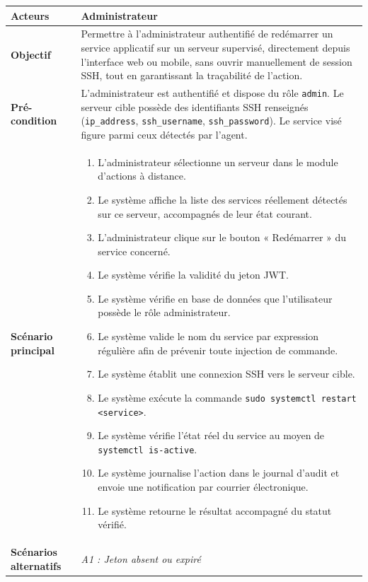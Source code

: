 \renewcommand{\arraystretch}{1.4}
\begin{longtable}{|p{3.0cm}|>{\raggedright\arraybackslash}p{11.4cm}|}
\hline
\textbf{Acteurs} & Administrateur \\
\hline
\textbf{Objectif} & Permettre à l'administrateur authentifié de redémarrer un service
applicatif sur un serveur supervisé, directement depuis l'interface web ou mobile, sans
ouvrir manuellement de session SSH, tout en garantissant la traçabilité de l'action. \\
\hline
\textbf{Pré-condition} & L'administrateur est authentifié et dispose du rôle
\texttt{admin}. Le serveur cible possède des identifiants SSH renseignés
(\texttt{ip\_address}, \texttt{ssh\_username}, \texttt{ssh\_password}). Le service visé
figure parmi ceux détectés par l'agent. \\
\hline
\textbf{Scénario principal} &
\begin{enumerate}[leftmargin=*, nosep]
  \item L'administrateur sélectionne un serveur dans le module d'actions à distance.
  \item Le système affiche la liste des services réellement détectés sur ce serveur,
        accompagnés de leur état courant.
  \item L'administrateur clique sur le bouton « Redémarrer » du service concerné.
  \item Le système vérifie la validité du jeton JWT.
  \item Le système vérifie en base de données que l'utilisateur possède le rôle
        administrateur.
  \item Le système valide le nom du service par expression régulière afin de prévenir
        toute injection de commande.
  \item Le système établit une connexion SSH vers le serveur cible.
  \item Le système exécute la commande \texttt{sudo systemctl restart <service>}.
  \item Le système vérifie l'état réel du service au moyen de
        \texttt{systemctl is-active}.
  \item Le système journalise l'action dans le journal d'audit et envoie une
        notification par courrier électronique.
  \item Le système retourne le résultat accompagné du statut vérifié.
\end{enumerate} \\
\hline
\textbf{Scénarios alternatifs} &
\textit{A1 : Jeton absent ou expiré}

\end{longtable}

